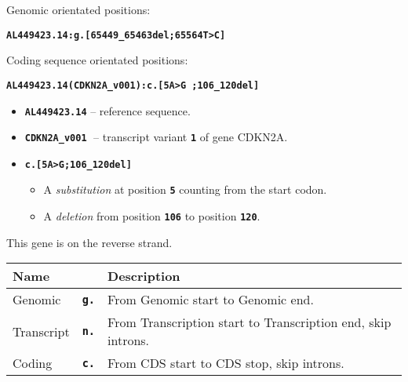 \documentclass[a4, portrait]{seminar}
\newcommand{\bt}[1]{\texttt{\textbf{#1}}}
\begin{document}
\begin{slide}

    Genomic orientated positions:
    \begin{center}
      \bt{AL449423.14:g.[65449\_65463del;65564\yellow T\white >\yellow C\white]}
    \end{center}
    \bigskip
    Coding sequence orientated positions:
    \begin{center}
      \bt{AL449423.14(CDKN2A\_v001):c.[5\yellow A\white >\yellow G\white
        ;106\_120del]}
    \end{center}
    \bigskip
    \begin{itemize}
      \item \bt{AL449423.14} -- reference sequence.
      \item \bt{CDKN2A\_v001}$\;$ -- transcript variant \bt{1} of gene CDKN2A.
      \item \bt{c.[5\yellow A\white >\yellow G\white ;106\_120del]} 
      \begin{itemize}
        \item A \emph{substitution} at position \bt{5} counting from the start
          codon.
        \item A \emph{deletion} from position \bt{106} to position \bt{120}.
      \end{itemize}
    \end{itemize}
  
  \vfill
\end{slide}

\begin{slide}

  \positionpicture

  This gene is on the reverse strand.

  \bigskip
  \begin{tabular}{l|l|l}
    Name       &         & Description\\
    \hline
    Genomic    & \bt{g.} & From {\scriptsize Genomic start} to
                           {\scriptsize Genomic end}. \\
    Transcript & \bt{n.} & From {\scriptsize Transcription start} to 
                           {\scriptsize Transcription end}, skip introns.\\
    Coding     & \bt{c.} & From {\scriptsize CDS start} to 
                           {\scriptsize CDS stop}, skip introns.
  \end{tabular}
  \vfill
\end{slide}
\end{document}
